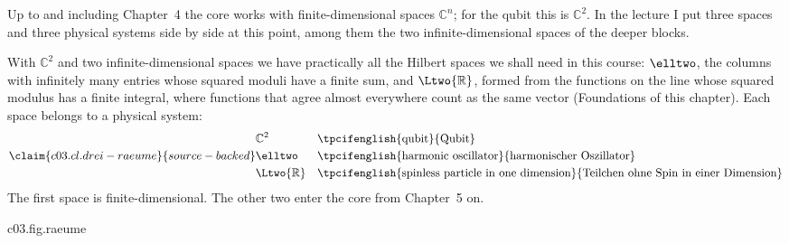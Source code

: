 Up to and including Chapter~4 the core works with finite-dimensional spaces $\mathbb{C}^n$;
for the qubit this is $\mathbb{C}^2$. In the lecture I put three spaces and three physical
systems side by side at this point, among them the two infinite-dimensional spaces of the
deeper blocks.

\begin{vertiefung}[id=c03.v3,
    titel={Three spaces, three systems},
    wozu={The three spaces of this chapter side by side, each with the physical system it
      belongs to. With them we have practically all the Hilbert spaces of the course.},
    voraussetzung={Blocks~\ref{c03.v1} and~\ref{c03.v2}. The core up to Chapter~4 does not
      need this block.},
    zurueck={Up to and including Chapter~4 the core works with $\mathbb{C}^n$; for the qubit
      this is $\mathbb{C}^2$.}]
  \begin{greybox}
  With $\mathbb{C}^2$ and two infinite-dimensional spaces we have practically all the Hilbert
  spaces we shall need in this course: $\elltwo$, the columns with infinitely many entries
  whose squared moduli have a finite sum, and $\Ltwo{\mathbb{R}}$, formed from the functions
  on the line whose squared modulus has a finite integral, where functions that agree almost
  everywhere count as the same vector (Foundations of this chapter). Each space belongs to a
  physical system:
  \begin{equation}\label{c03.eq.drei-raeume}\claim{c03.cl.drei-raeume}{source-backed}
    \begin{aligned}
      &\mathbb{C}^2 && \text{\tpcifenglish{qubit}{Qubit}} \\
      &\elltwo && \text{\tpcifenglish{harmonic oscillator}{harmonischer Oszillator}} \\
      &\Ltwo{\mathbb{R}} && \text{\tpcifenglish{spinless particle in one dimension}{Teilchen ohne Spin in einer Dimension}}
    \end{aligned}
  \end{equation}
  The first space is finite-dimensional. The other two enter the core from Chapter~5 on.
  \end{greybox}

\begin{tpcfigure}{c03.fig.raeume}
  \caption{The three spaces side by side, each with the squared moduli of one vector.
    (a) $\mathbb{C}^2$: the vector $\tfrac12\vb{v}$ with $\vb{v}$ from
    Equation~\eqref{c03.eq.c2-vektoren}; its two squared moduli are $\tfrac12$ each.
    (b) $\elltwo$: the squared moduli $\abs{v_j}^2 = 1/j^2$ of the first twelve entries of the
    vector with $v_j = 1/j$; infinitely many more follow. (c) $\Ltwo{\mathbb{R}}$: the squared
    modulus $\abs{f(x)}^2 = e^{-x^2}$ of the function $f(x) = e^{-x^2/2}$. The inner product
    of the vector with itself is a sum of two bars on the left, a sum of infinitely many in the
    middle, and the area under the curve on the right.}
  \end{tpcfigure}
\end{vertiefung}

